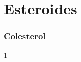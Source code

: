 \documentclass[\mainfilename]{subfiles}
\begin{document}


\part*{Esteroides}

\section{Colesterol}
\begin{questionBox}1{}
    
    
    
\end{questionBox}
\end{document}
